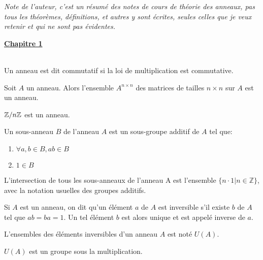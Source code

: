 \documentclass[12pt,a4paper]{article}
\begin{document}
\begin{flushleft}

\textit{Note de l'auteur, c'est un résumé des notes de cours de théorie des anneaux, pas tous les théorèmes, définitions, et autres y sont écrites, seules celles que je veux retenir et qui ne sont pas évidentes.}\dbs

\textbf{\underline{Chapitre 1}}\\~\\

\begin{mydef}
Un anneau est dit commutatif si la loi de multiplication est commutative.
\end{mydef}

\begin{prop} Soit $A$ un anneau. Alors l'ensemble $A^{n \times n}$ des matrices de tailles $n \times n$ sur $A$ est un anneau.\end{prop} 

\begin{prop} $\mathbb{Z} / n \mathbb{Z}$ est un anneau.
\end{prop}

\begin{mydef} Un sous-anneau $B$ de l'anneau $A$ est un sous-groupe additif de $A$ tel que:
\begin{enumerate}
\item $ \forall a,b \in B, ab \in B $
\item $ 1 \in B$
\end{enumerate} 
\end{mydef}

\begin{cor} 
L'intersection de tous les sous-anneaux de l'anneau A est l'ensemble $ \{ n \cdot 1 | n \in \mathbb{Z} \} $, avec la notation usuelles des groupes additifs.
\end{cor}

\begin{mydef}
Si $A$ est un anneau, on dit qu'un élément $a$ de $A$ est inversible s'il existe $b$ de $A$ tel que $ab=ba=1$. Un tel élément $b$ est alors unique et est appelé inverse de $a$.
\end{mydef}

\begin{mydef}
L'ensembles des éléments inversibles d'un anneau $A$ est noté $U(A)$. 
\end{mydef}

\begin{prop}
$U(A)$ est un groupe sous la multiplication.
\end{prop}


\end{flushleft}
\end{document}
